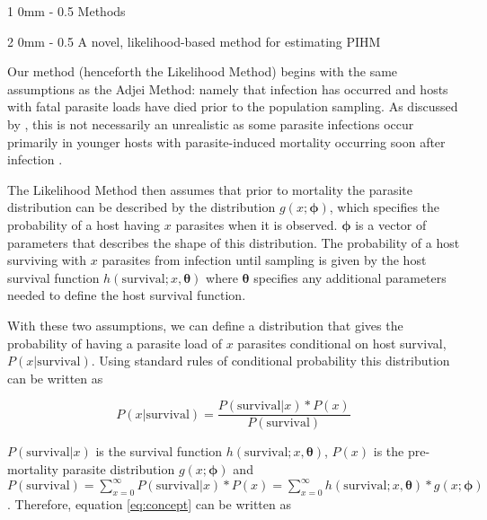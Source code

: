 \documentclass[12pt, a4paper]{article}
\makeatletter
\renewcommand{\section}{\@startsection
{section}%
{1}%
{0mm}%
{-\baselineskip}%
{0.5\baselineskip}%
{\normalfont\bf\large}} %
\renewcommand{\subsection}{\@startsection
{subsection}%
{2}%
{0mm}%
{-\baselineskip}%
{0.5\baselineskip}%
{\normalfont\bf}} %
\makeatother
\begin{document}
\section{Methods}

\subsection{A novel, likelihood-based method for estimating PIHM}

Our method (henceforth the Likelihood Method) begins with the same assumptions as the Adjei Method: namely that infection has occurred and hosts with fatal parasite loads have died prior to the population sampling. As discussed by
\citeauthor{Adjei1986}, this is not necessarily an unrealistic as some parasite infections occur primarily in younger hosts with parasite-induced mortality occurring soon after infection \citep[e.g.][]{Schotthoefer2003,Johnson2008}.

The Likelihood Method then assumes that prior to mortality the parasite distribution can be described by the distribution $g(x; \boldsymbol{\phi})$, which specifies the probability of a host having $x$ parasites when it is observed.  $\boldsymbol{\phi}$ is a vector of parameters that describes the shape of this distribution. The probability of a host surviving with $x$ parasites from infection until sampling is given by the host survival function $h(\text{survival} ; x, \boldsymbol{\theta})$ where $\boldsymbol{\theta}$ specifies any additional parameters needed to define the host survival function.

With these two assumptions, we can define a distribution that gives the probability of having a parasite load of $x$ parasites conditional on host survival, $P(x | \text{survival})$.  Using standard rules of conditional probability this distribution can be written as

\begin{equation}
    P(x | \text{survival}) = \dfrac{P(\text{survival} | x) * P(x)}{P(\text{survival})}
    \label{eq:concept}
\end{equation}

$P(\text{survival} | x)$ is the survival function $h(\text{survival}; x, \boldsymbol{\theta})$, $P(x)$ is the pre-mortality parasite distribution $g(x; \boldsymbol{\phi})$ and $P(\text{survival}) = \sum_{x=0}^{\infty} P(\text{survival} | x) * P(x) =  \sum_{x=0}^{\infty} h(\text{survival}; x, \boldsymbol{\theta})  * g(x; \boldsymbol{\phi})$. Therefore, equation \ref{eq:concept} can be written as
\end{document}

